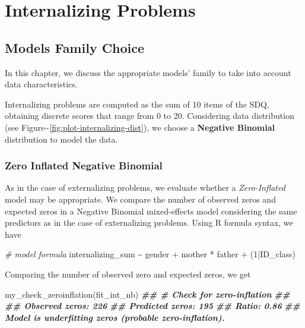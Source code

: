 \documentclass[
]{book}
\newenvironment{Shaded}{\begin{snugshade}}{\end{snugshade}}
\newcommand{\CommentTok}[1]{\textcolor[rgb]{0.56,0.35,0.01}{\textit{#1}}}
\newcommand{\DecValTok}[1]{\textcolor[rgb]{0.00,0.00,0.81}{#1}}
\newcommand{\DocumentationTok}[1]{\textcolor[rgb]{0.56,0.35,0.01}{\textbf{\textit{#1}}}}
\newcommand{\FunctionTok}[1]{\textcolor[rgb]{0.00,0.00,0.00}{#1}}
\newcommand{\NormalTok}[1]{#1}
\newcommand{\SpecialCharTok}[1]{\textcolor[rgb]{0.00,0.00,0.00}{#1}}
\begin{document}
\hypertarget{part-internalizing-problems}{%
\part*{Internalizing Problems}\label{part-internalizing-problems}}

\hypertarget{model-choice-int}{%
\chapter{Models Family Choice}\label{model-choice-int}}

In this chapter, we discuss the appropriate models' family to take into account data characteristics.

Internalizing problems are computed as the sum of 10 items of the SDQ, obtaining discrete scores that range from 0 to 20. Considering data distribution (see Figure\textasciitilde\ref{fig:plot-internalizing-dist}), we choose a \textbf{Negative Binomial} distribution to model the data.

\hypertarget{zero-inflated-negative-binomial-1}{%
\section{Zero Inflated Negative Binomial}\label{zero-inflated-negative-binomial-1}}

As in the case of externalizing problems, we evaluate whether a \emph{Zero-Inflated} model may be appropriate. We compare the number of observed zeros and expected zeros in a Negative Binomial mixed-effects model considering the same predictors as in the case of externalizing problems. Using R formula syntax, we have

\begin{Shaded}
\begin{Highlighting}[]
\CommentTok{\# model formula}
\NormalTok{internalizing\_sum }\SpecialCharTok{\textasciitilde{}}\NormalTok{ gender }\SpecialCharTok{+}\NormalTok{ mother }\SpecialCharTok{*}\NormalTok{ father }\SpecialCharTok{+}\NormalTok{ (}\DecValTok{1}\SpecialCharTok{|}\NormalTok{ID\_class)}
\end{Highlighting}
\end{Shaded}

Comparing the number of observed zero and expected zeros, we get

\begin{Shaded}
\begin{Highlighting}[]
\FunctionTok{my\_check\_zeroinflation}\NormalTok{(fit\_int\_nb)}
\DocumentationTok{\#\# \# Check for zero{-}inflation}
\DocumentationTok{\#\# }
\DocumentationTok{\#\#    Observed zeros: 226}
\DocumentationTok{\#\#   Predicted zeros: 195}
\DocumentationTok{\#\#             Ratio: 0.86}
\DocumentationTok{\#\# Model is underfitting zeros (probable zero{-}inflation).}
\end{Highlighting}
\end{Shaded}
\end{document}
